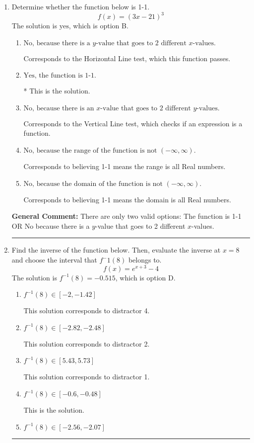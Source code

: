\documentclass{extbook}[14pt]
\newcommand{\litem}[1]{\item #1

\rule{\textwidth}{0.4pt}}
\begin{document}
\begin{enumerate}\litem{
Determine whether the function below is 1-1.
\[ f(x) = (3 x - 21)^3 \]The solution is \( \text{yes} \), which is option B.\begin{enumerate}[label=\Alph*.]
\item \( \text{No, because there is a $y$-value that goes to 2 different $x$-values.} \)

Corresponds to the Horizontal Line test, which this function passes.
\item \( \text{Yes, the function is 1-1.} \)

* This is the solution.
\item \( \text{No, because there is an $x$-value that goes to 2 different $y$-values.} \)

Corresponds to the Vertical Line test, which checks if an expression is a function.
\item \( \text{No, because the range of the function is not $(-\infty, \infty)$.} \)

Corresponds to believing 1-1 means the range is all Real numbers.
\item \( \text{No, because the domain of the function is not $(-\infty, \infty)$.} \)

Corresponds to believing 1-1 means the domain is all Real numbers.
\end{enumerate}

\textbf{General Comment:} There are only two valid options: The function is 1-1 OR No because there is a $y$-value that goes to 2 different $x$-values.
}
\litem{
Find the inverse of the function below. Then, evaluate the inverse at $x = 8$ and choose the interval that $f^-1(8)$ belongs to.
\[ f(x) = e^{x+3}-4 \]The solution is \( f^{-1}(8) = -0.515 \), which is option D.\begin{enumerate}[label=\Alph*.]
\item \( f^{-1}(8) \in [-2, -1.42] \)

 This solution corresponds to distractor 4.
\item \( f^{-1}(8) \in [-2.82, -2.48] \)

 This solution corresponds to distractor 2.
\item \( f^{-1}(8) \in [5.43, 5.73] \)

 This solution corresponds to distractor 1.
\item \( f^{-1}(8) \in [-0.6, -0.48] \)

 This is the solution.
\item \( f^{-1}(8) \in [-2.56, -2.07] \)


\end{enumerate}}
\end{enumerate}
\end{document}
